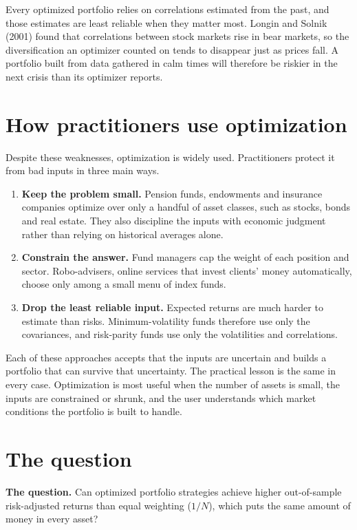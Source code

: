 Every optimized portfolio relies on correlations estimated from the past, and those estimates are least reliable when they matter most. Longin and Solnik (2001) found that correlations between stock markets rise in bear markets, so the diversification an optimizer counted on tends to disappear just as prices fall. A portfolio built from data gathered in calm times will therefore be riskier in the next crisis than its optimizer reports.


\section{How practitioners use optimization}
\label{sec:12-practice}

Despite these weaknesses, optimization is widely used. Practitioners protect it from bad inputs in three main ways.

\begin{enumerate}
  \item \textbf{Keep the problem small.} Pension funds, endowments and insurance companies optimize over only a handful of asset classes, such as stocks, bonds and real estate. They also discipline the inputs with economic judgment rather than relying on historical averages alone.
  \item \textbf{Constrain the answer.} Fund managers cap the weight of each position and sector. Robo-advisers, online services that invest clients' money automatically, choose only among a small menu of index funds.
  \item \textbf{Drop the least reliable input.} Expected returns are much harder to estimate than risks. Minimum-volatility funds therefore use only the covariances, and risk-parity funds use only the volatilities and correlations.
\end{enumerate}

Each of these approaches accepts that the inputs are uncertain and builds a portfolio that can survive that uncertainty. The practical lesson is the same in every case. Optimization is most useful when the number of assets is small, the inputs are constrained or shrunk, and the user understands which market conditions the portfolio is built to handle.
\section{The question}
\label{sec:12-claim}

\begin{callout}
\textbf{The question.} Can optimized portfolio strategies achieve higher out-of-sample risk-adjusted returns than equal weighting ($1/N$), which puts the same amount of money in every asset?
\end{callout}

